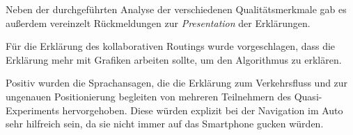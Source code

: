 Neben der durchgeführten Analyse der verschiedenen Qualitätsmerkmale gab es außerdem vereinzelt Rückmeldungen zur \textit{Presentation} der Erklärungen.

Für die Erklärung des kollaborativen Routings wurde vorgeschlagen, dass die Erklärung mehr mit Grafiken arbeiten sollte, um den Algorithmus zu erklären.

Positiv wurden die Sprachansagen, die die Erklärung zum Verkehrsfluss und zur ungenauen Positionierung begleiten von mehreren Teilnehmern des Quasi-Experiments hervorgehoben. Diese würden explizit bei der Navigation im Auto sehr hilfreich sein, da sie nicht immer auf das Smartphone gucken würden.

